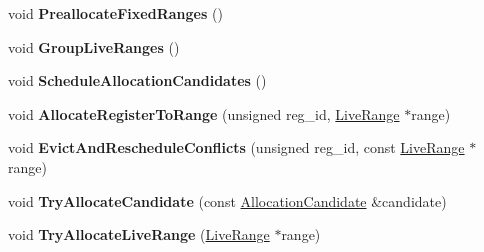 \begin{DoxyCompactItemize}
\item 
void {\bfseries Preallocate\+Fixed\+Ranges} ()\hypertarget{classv8_1_1internal_1_1compiler_1_1_greedy_allocator_a096e9e89d6fac3aef1be2bdc8f9bd685}{}\label{classv8_1_1internal_1_1compiler_1_1_greedy_allocator_a096e9e89d6fac3aef1be2bdc8f9bd685}

\item 
void {\bfseries Group\+Live\+Ranges} ()\hypertarget{classv8_1_1internal_1_1compiler_1_1_greedy_allocator_a9405d2a4938a0f13d112d03e13388e1a}{}\label{classv8_1_1internal_1_1compiler_1_1_greedy_allocator_a9405d2a4938a0f13d112d03e13388e1a}

\item 
void {\bfseries Schedule\+Allocation\+Candidates} ()\hypertarget{classv8_1_1internal_1_1compiler_1_1_greedy_allocator_aedf858fa48c0e3feeccf04a193436f21}{}\label{classv8_1_1internal_1_1compiler_1_1_greedy_allocator_aedf858fa48c0e3feeccf04a193436f21}

\item 
void {\bfseries Allocate\+Register\+To\+Range} (unsigned reg\+\_\+id, \hyperlink{classv8_1_1internal_1_1compiler_1_1_live_range}{Live\+Range} $\ast$range)\hypertarget{classv8_1_1internal_1_1compiler_1_1_greedy_allocator_a155ce1a6768820b280ff02c12cd5679f}{}\label{classv8_1_1internal_1_1compiler_1_1_greedy_allocator_a155ce1a6768820b280ff02c12cd5679f}

\item 
void {\bfseries Evict\+And\+Reschedule\+Conflicts} (unsigned reg\+\_\+id, const \hyperlink{classv8_1_1internal_1_1compiler_1_1_live_range}{Live\+Range} $\ast$range)\hypertarget{classv8_1_1internal_1_1compiler_1_1_greedy_allocator_af41dfcd6b63d33aedd49559f6c3a0364}{}\label{classv8_1_1internal_1_1compiler_1_1_greedy_allocator_af41dfcd6b63d33aedd49559f6c3a0364}

\item 
void {\bfseries Try\+Allocate\+Candidate} (const \hyperlink{classv8_1_1internal_1_1compiler_1_1_allocation_candidate}{Allocation\+Candidate} \&candidate)\hypertarget{classv8_1_1internal_1_1compiler_1_1_greedy_allocator_a69304caff98ed11761ae9059c40ea1e0}{}\label{classv8_1_1internal_1_1compiler_1_1_greedy_allocator_a69304caff98ed11761ae9059c40ea1e0}

\item 
void {\bfseries Try\+Allocate\+Live\+Range} (\hyperlink{classv8_1_1internal_1_1compiler_1_1_live_range}{Live\+Range} $\ast$range)\hypertarget{classv8_1_1internal_1_1compiler_1_1_greedy_allocator_a70b408609a673089eb0351fe54ae9c9c}{}\label{classv8_1_1internal_1_1compiler_1_1_greedy_allocator_a70b408609a673089eb0351fe54ae9c9c}


\end{DoxyCompactItemize}
